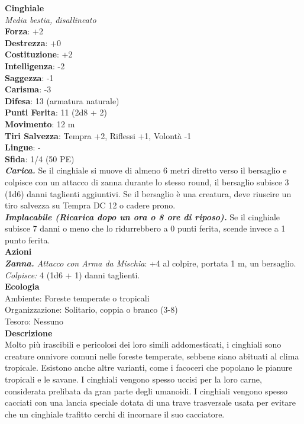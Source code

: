\begin{multicols}{2}
\medskip\textbf{Cinghiale}\\
\emph{Media bestia, disallineato}\\
\textbf{Forza}: +2\\
\textbf{Destrezza}: +0\\
\textbf{Costituzione}: +2\\
\textbf{Intelligenza}: -2\\
\textbf{Saggezza}: -1\\
\textbf{Carisma}: -3\\
\textbf{Difesa}: 13 (armatura naturale)\\
\textbf{Punti Ferita}: 11 (2d8 + 2)\\
\textbf{Movimento}: 12 m\\
\textbf{Tiri Salvezza}: Tempra +2, Riflessi +1, Volontà -1 \\
\textbf{Lingue}: -\\
\textbf{Sfida}: 1/4 (50 PE)\smallskip\\
\emph{\textbf{Carica.}} Se il cinghiale si muove di almeno 6 metri diretto verso il bersaglio e colpisce con un attacco di zanna durante lo stesso round, il bersaglio subisce 3 (1d6) danni taglienti aggiuntivi. Se il bersaglio è una creatura, deve riuscire un tiro salvezza su Tempra DC  12 o cadere prono.\\
\emph{\textbf{Implacabile (Ricarica dopo un ora o 8 ore di riposo).}} Se il cinghiale subisce 7 danni o meno che lo ridurrebbero a 0 punti ferita, scende invece a 1 punto ferita.\\
\smallskip\textbf{Azioni}\\
\emph{\textbf{Zanna.} Attacco con Arma da Mischia}: +4 al colpire, portata 1 m, un bersaglio.\\
\emph{Colpisce:} 4 (1d6 + 1) danni taglienti. \\
\textbf{Ecologia}\\
Ambiente: Foreste temperate o tropicali\\
Organizzazione: Solitario, coppia o branco (3-8)\\
Tesoro: Nessuno\\
\textbf{Descrizione}\\

Molto più irascibili e pericolosi dei loro simili addomesticati, i cinghiali sono creature onnivore comuni nelle foreste temperate, sebbene siano abituati al clima tropicale. Esistono anche altre varianti, come i facoceri che popolano le pianure tropicali e le savane. I cinghiali vengono spesso uccisi per la loro carne, considerata prelibata da gran parte degli umanoidi. I cinghiali vengono spesso cacciati con una lancia speciale dotata di una trave trasversale usata per evitare che un cinghiale trafitto cerchi di incornare il suo cacciatore.\\


\end{multicols}
